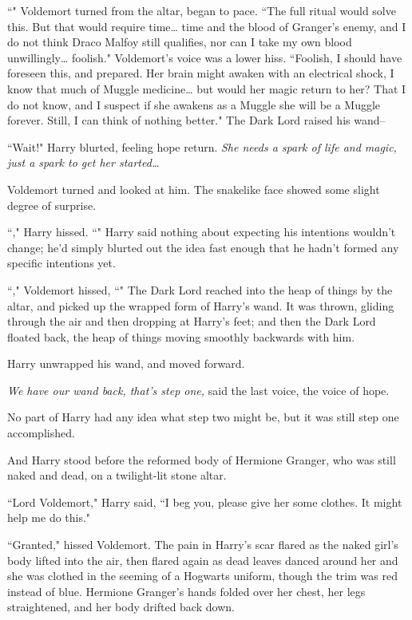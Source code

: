 ``" Voldemort turned from the altar, began to pace. ``The full ritual would solve this. But that would require time{\ldots} time and the blood of Granger's enemy, and I do not think Draco Malfoy still qualifies, nor can I take my own blood unwillingly{\ldots} foolish." Voldemort's voice was a lower hiss. ``Foolish, I should have foreseen this, and prepared. Her brain might awaken with an electrical shock, I know that much of Muggle medicine{\ldots} but would her magic return to her? That I do not know, and I suspect if she awakens as a Muggle she will be a Muggle forever. Still, I can think of nothing better." The Dark Lord raised his wand\---

``Wait!" Harry blurted, feeling hope return. \emph{She needs a spark of life and magic, just a spark to get her started{\ldots}}

Voldemort turned and looked at him. The snakelike face showed some slight degree of surprise.

``," Harry hissed. ``" Harry said nothing about expecting his intentions wouldn't change; he'd simply blurted out the idea fast enough that he hadn't formed any specific intentions yet.

``," Voldemort hissed, ``" The Dark Lord reached into the heap of things by the altar, and picked up the wrapped form of Harry's wand. It was thrown, gliding through the air and then dropping at Harry's feet; and then the Dark Lord floated back, the heap of things moving smoothly backwards with him.

Harry unwrapped his wand, and moved forward.

\emph{We have our wand back, that's step one,} said the last voice, the voice of hope.

No part of Harry had any idea what step two might be, but it was still step one accomplished.

And Harry stood before the reformed body of Hermione Granger, who was still naked and dead, on a twilight-lit stone altar.

``Lord Voldemort," Harry said, ``I beg you, please give her some clothes. It might help me do this."

``Granted," hissed Voldemort. The pain in Harry's scar flared as the naked girl's body lifted into the air, then flared again as dead leaves danced around her and she was clothed in the seeming of a Hogwarts uniform, though the trim was red instead of blue. Hermione Granger's hands folded over her chest, her legs straightened, and her body drifted back down.

